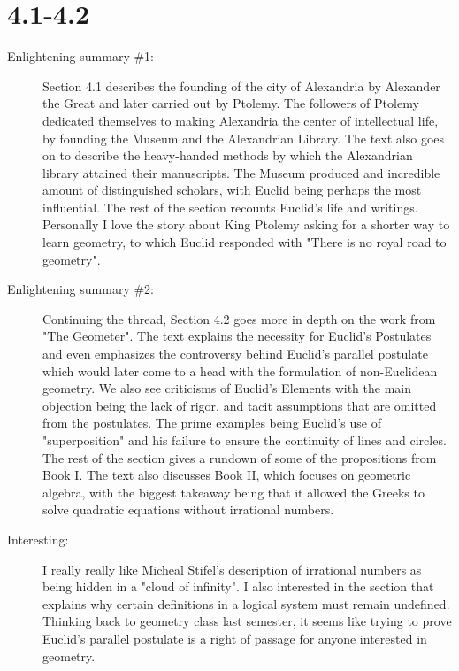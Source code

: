 \documentclass[12pt]{article}
\theoremstyle{homework}
\begin{document}
\section*{4.1-4.2}

\begin{description}
\item[Enlightening summary \#1:]
 Section 4.1 describes the founding of the city of Alexandria by Alexander the Great and later carried out by Ptolemy. The followers of Ptolemy
 dedicated themselves to making Alexandria the center of intellectual life, by founding the Museum and the Alexandrian Library. The text also goes on to 
 describe the heavy-handed methods by which the Alexandrian library attained their manuscripts. The Museum produced and incredible amount of distinguished scholars, with 
 Euclid being perhaps the most influential. The rest of the section recounts Euclid's life and writings. Personally I love the story about King Ptolemy asking for a shorter way to
 learn geometry, to which Euclid responded with  "There is no royal road to geometry". 
 
\item[Enlightening summary \#2:] 
 Continuing the thread, Section 4.2 goes more in depth on the work from "The Geometer". The text explains the necessity 
 for Euclid's Postulates and even emphasizes the controversy behind Euclid's parallel postulate which would later come to a head with the formulation of
 non-Euclidean geometry. We also see criticisms of Euclid's Elements with the main objection being the lack of rigor, and tacit assumptions that are omitted from 
 the postulates. The prime examples being Euclid's use of "superposition" and his failure to ensure the continuity of lines and circles. The rest of the section gives a rundown of
 some of the propositions from Book I. The text also discusses Book II, which focuses on geometric algebra, with the biggest takeaway being that it allowed the Greeks to solve quadratic 
 equations without irrational numbers. 


\item[Interesting:] I really really like Micheal Stifel's description of irrational numbers as being hidden in a "cloud of infinity". I also interested in
the section that explains why certain definitions in a logical system must remain undefined. Thinking back to geometry class last semester,
it seems like trying to prove Euclid's parallel postulate is a right of passage for anyone interested in geometry.                                                                                                 
 

\end{description}
\end{document}
